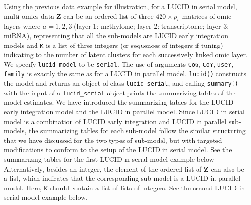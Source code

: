 Using the previous data example for illustration, for a LUCID in serial
model, multi-omics data \(\boldsymbol{\mathbf{Z}}\) can be an ordered list
of three \(420 \times p_a\) matrices of omic layers where \(a = 1, 2, 3\)
(layer 1: methylome; layer 2: transcriptome; layer 3: miRNA),
representing that all the sub-models are LUCID early integration models
and \texttt{K} is a list of three integers (or sequences of integers if tuning)
indicating to the number of latent clusters for each successively linked
omic layer. We specify \texttt{lucid\textasciigrave{}\textasciigrave{}\_\textasciigrave{}\textasciigrave{}model} to be \texttt{serial}. The use of
arguments \texttt{CoG}, \texttt{CoY}, \texttt{useY}, \texttt{family} is exactly the same as for a
LUCID in parallel model. \texttt{lucid()} constructs the model and returns an
object of class \texttt{lucid\textasciigrave{}\textasciigrave{}\_\textasciigrave{}\textasciigrave{}serial}, and calling \texttt{summary()} with the
input of a \texttt{lucid\textasciigrave{}\textasciigrave{}\_\textasciigrave{}\textasciigrave{}serial} object prints the summarizing tables of
the model estimates. We have introduced the summarizing tables for the
LUCID early integration model and the LUCID in parallel model. Since
LUCID in serial model is a combination of LUCID early integration and
LUCID in parallel sub-models, the summarizing tables for each sub-model
follow the similar structuring that we have discussed for the two types
of sub-model, but with targeted modifications to conform to the setup of
the LUCID in serial model. See the summarizing tables for the first
LUCID in serial model example below. Alternatively, besides an integer,
the element of the ordered list of \(\boldsymbol{\mathbf{Z}}\) can also be
a list, which indicates that the corresponding sub-model is a LUCID in
parallel model. Here, \texttt{K} should contain a list of lists of integers.
See the second LUCID in serial model example below.

